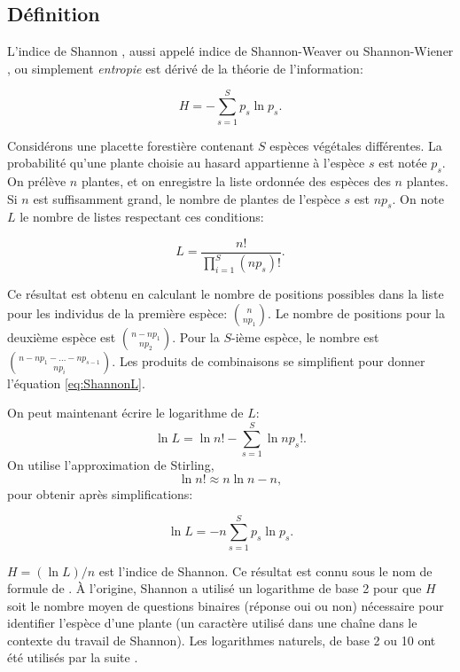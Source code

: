 \documentclass[
  11pt,
  american,
  a4paper,
  extrafontsizes,onecolumn,openright
  ]{memoir}
\begin{document}
\subsection{Définition}\label{duxe9finition-1}

L'indice de Shannon \autocite{Shannon1948,Shannon1963}, aussi appelé indice de Shannon-Weaver ou Shannon-Wiener \autocite{Spellerberg2003}, ou simplement \emph{entropie} est dérivé de la théorie de l'information:

\begin{equation}
  \label{eq:Shannon}
  H = -\sum^S_{s=1}{p_s\ln{p_s}}.
\end{equation}

Considérons une placette forestière contenant \(S\) espèces végétales différentes.
La probabilité qu'une plante choisie au hasard appartienne à l'espèce \(s\) est notée \(p_s\).
On prélève \(n\) plantes, et on enregistre la liste ordonnée des espèces des \(n\) plantes.
Si \(n\) est suffisamment grand, le nombre de plantes de l'espèce \(s\) est \(np_s\).
On note \(L\) le nombre de listes respectant ces conditions:

\begin{equation}
  \label{eq:ShannonL}
  L = \frac{n!}{\prod^S_{i=1}{\left( {np}_s \right)!}}.
\end{equation}

Ce résultat est obtenu en calculant le nombre de positions possibles dans la liste pour les individus de la première espèce: \(\binom{n}{np_1}\).
Le nombre de positions pour la deuxième espèce est \(\binom{n-np_1}{np_2}\).
Pour la \(S\)-ième espèce, le nombre est \(\binom{n-np_1-\dots -np_{s-1}}{np_i}\).
Les produits de combinaisons se simplifient pour donner l'équation \eqref{eq:ShannonL}.

On peut maintenant écrire le logarithme de \(L\):
\[\ln{L} = \ln{n!} - \sum^S_{s=1}{\ln{np_s}!}.\]
On utilise l'approximation de Stirling,
\[\ln{n!} \approx n \ln{n} - n,\]
pour obtenir après simplifications:

\begin{equation}
  \label{eq:ShannonlnL}
  \ln{L} = -n \sum^S_{s=1}{p_s \ln{p_s}}.
\end{equation}

\(H = (\ln{L}) / n\) est l'indice de Shannon.
Ce résultat est connu sous le nom de formule de \textcite{Brillouin1962}.
À l'origine, Shannon a utilisé un logarithme de base 2 pour que \(H\) soit le nombre moyen de questions binaires (réponse oui ou non) nécessaire pour identifier l'espèce d'une plante (un caractère utilisé dans une chaîne dans le contexte du travail de Shannon).
Les logarithmes naturels, de base 2 ou 10 ont été utilisés par la suite \autocite{Pielou1966a}.
\end{document}
